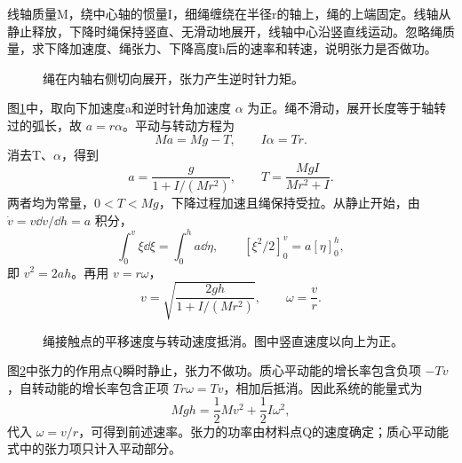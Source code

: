 \begin{exercise}[绕绳下降的线轴]\label{deep6:problem-exercise-9}\label{deep6:ex:d5-h9}
线轴质量M，绕中心轴的惯量I，细绳缠绕在半径r的轴上，绳的上端固定。线轴从静止释放，下降时绳保持竖直、无滑动地展开，线轴中心沿竖直线运动。忽略绳质量，求下降加速度、绳张力、下降高度h后的速率和转速，说明张力是否做功。
\end{exercise}
\begin{figure}[H]\centering
{}
\caption{绳在内轴右侧切向展开，张力产生逆时针力矩。}\label{deep6:fig:d5-h9-q}
\end{figure}
\begin{solution}
图\ref{deep6:fig:d5-h9-q}中，取向下加速度a和逆时针角加速度 $\alpha$ 为正。绳不滑动，展开长度等于轴转过的弧长，故 $a=r\alpha$。平动与转动方程为
\[
Ma=Mg-T,\qquad I\alpha=Tr.
\]
消去T、$\alpha$，得到
\[
a=\frac{g}{1+I/(Mr^2)},\qquad
T=\frac{MgI}{Mr^2+I}.
\]
两者均为常量，$0<T<Mg$，下降过程加速且绳保持受拉。从静止开始，由 $\dot v=v\dd v/\dd h=a$ 积分，
\[
\int_0^v\xi\dd\xi=\int_0^ha\dd\eta,
\qquad [\xi^2/2]_0^v=a[\eta]_0^h,
\]
即 $v^2=2ah$。再用 $v=r\omega$，
\[
v=\sqrt{\frac{2gh}{1+I/(Mr^2)}},\qquad \omega=\frac vr.
\]
\begin{figure}[H]\centering
{}
\caption{绳接触点的平移速度与转动速度抵消。图中竖直速度以向上为正。}\label{deep6:fig:d5-h9-s}
\end{figure}
图\ref{deep6:fig:d5-h9-s}中张力的作用点Q瞬时静止，张力不做功。质心平动能的增长率包含负项 $-Tv$，自转动能的增长率包含正项 $Tr\omega=Tv$，相加后抵消。因此系统的能量式为
\[
Mgh=\frac12Mv^2+\frac12I\omega^2,
\]
代入 $\omega=v/r$，可得到前述速率。张力的功率由材料点Q的速度确定；质心平动能式中的张力项只计入平动部分。
\end{solution}


